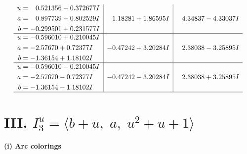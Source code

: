 \documentclass[1p]{elsarticle_modified}
\theoremstyle{definition}
\begin{document}
$$\begin{array}{c|c|c}
\begin{aligned}
u &= \phantom{-}0.521356 - 0.372677 I \\
a &= \phantom{-}0.897739 - 0.802529 I \\
b &= -0.299501 + 0.231577 I\end{aligned}
 & \phantom{-}1.18281 + 1.86595 I & \phantom{-}4.34837 - 4.33037 I \\ \hline\begin{aligned}
u &= -0.596010 + 0.210045 I \\
a &= -2.57670 + 0.72377 I \\
b &= -1.36154 + 1.18102 I\end{aligned}
 & -0.47242 + 3.20284 I & \phantom{-}2.38038 - 3.25895 I \\ \hline\begin{aligned}
u &= -0.596010 - 0.210045 I \\
a &= -2.57670 - 0.72377 I \\
b &= -1.36154 - 1.18102 I\end{aligned}
 & -0.47242 - 3.20284 I & \phantom{-}2.38038 + 3.25895 I\\
 \hline 
 \end{array}$$\newpage\newpage\renewcommand{\arraystretch}{1}
\centering \section*{III. $I^u_{3}= \langle b+u,\;a,\;u^2+u+1 \rangle$}
\flushleft \textbf{(i) Arc colorings}\\
\end{document}
